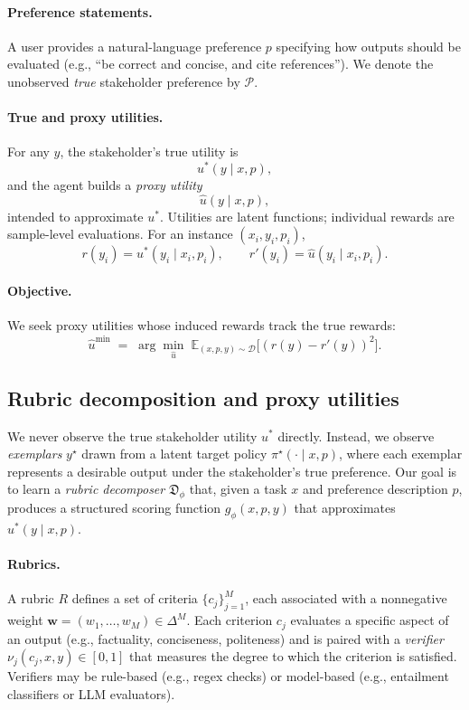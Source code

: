 \documentclass[sigconf]{acmart}
\begin{document}
\paragraph{Preference statements.}
A user provides a natural-language preference \(p\) specifying how outputs should be evaluated (e.g., “be correct and concise, and cite references”). We denote the unobserved \emph{true} stakeholder preference by \(\mathcal{P}\).

\paragraph{True and proxy utilities.}
For any \(y\), the stakeholder’s true utility is
\[
u^*(y \mid x,p),
\]
and the agent builds a \emph{proxy utility}
\[
\hat u(y \mid x,p),
\]
intended to approximate \(u^*\). Utilities are latent functions; individual rewards are sample-level evaluations. For an instance \((x_i,y_i,p_i)\),
\[
r(y_i)=u^*(y_i\mid x_i,p_i), \qquad r'(y_i)=\hat u(y_i\mid x_i,p_i).
\]

\paragraph{Objective.}
We seek proxy utilities whose induced rewards track the true rewards:
\begin{equation}
\hat u^{\min} \;=\; \arg\min_{\hat u}\;
\mathbb{E}_{(x,p,y) \sim \mathcal{D}}\Big[(r(y) - r'(y))^2\Big].
\label{eq:utility-gap}
\end{equation}

\subsection{Rubric decomposition and proxy utilities}
\label{sec:rubrics}

We never observe the true stakeholder utility \(u^*\) directly.  
Instead, we observe \emph{exemplars} \(y^\star\) drawn from a latent target policy
\(\pi^\star(\cdot \mid x,p)\), where each exemplar represents a desirable output under the stakeholder's
true preference.  
Our goal is to learn a \emph{rubric decomposer} \(\mathfrak{D}_\phi\) that, given a task \(x\) and
preference description \(p\), produces a structured scoring function \(g_\phi(x,p,y)\)
that approximates \(u^*(y\mid x,p)\).

\paragraph{Rubrics.}
A rubric \(R\) defines a set of criteria 
\(\{c_j\}_{j=1}^M\), each associated with a nonnegative weight 
\(\mathbf{w}=(w_1,\dots,w_M)\in\Delta^M\).  
Each criterion \(c_j\) evaluates a specific aspect of an output
(e.g., factuality, conciseness, politeness) and is paired with a \emph{verifier}
\(\nu_j(c_j, x, y)\in[0,1]\) that measures the degree to which the criterion is satisfied.
Verifiers may be rule-based (e.g., regex checks) or model-based (e.g., entailment classifiers or LLM evaluators).
\end{document}
